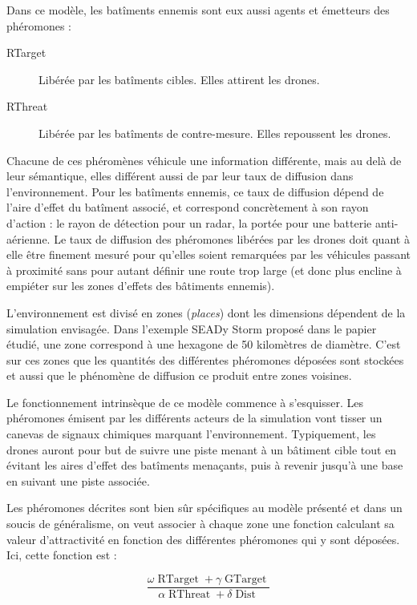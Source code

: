 \documentclass[12pt]{article}
\begin{document}
Dans ce modèle, les batîments ennemis sont eux aussi agents et
émetteurs des phéromones :

\begin{description}
\item[RTarget]{Libérée par les batîments cibles. Elles attirent les
  drones.}
\item[RThreat]{Libérée par les batîments de contre-mesure. Elles
  repoussent les drones.}
\end{description}

Chacune de ces phéromènes véhicule une information différente, mais au
delà de leur sémantique, elles différent aussi de par leur taux de
diffusion dans l'environnement.  Pour les batîments ennemis, ce taux
de diffusion dépend de l'aire d'effet du batîment associé, et
correspond concrètement à son rayon d'action : le rayon de détection
pour un radar, la portée pour une batterie anti-aérienne.  Le taux de
diffusion des phéromones libérées par les drones doit quant à elle
être finement mesuré pour qu'elles soient remarquées par les véhicules
passant à proximité sans pour autant définir une route trop large (et
donc plus encline à empiéter sur les zones d'effets des bâtiments
ennemis).

L'environnement est divisé en zones (\textit{places}) dont les
dimensions dépendent de la simulation envisagée.  Dans l'exemple SEADy
Storm proposé dans le papier étudié, une zone correspond à une
hexagone de 50 kilomètres de diamètre.  C'est sur ces zones que les
quantités des différentes phéromones déposées sont stockées et aussi
que le phénomène de diffusion ce produit entre zones voisines.

Le fonctionnement intrinsèque de ce modèle commence à s'esquisser. Les
phéromones émisent par les différents acteurs de la simulation vont
tisser un canevas de signaux chimiques marquant l'environnement.
Typiquement, les drones auront pour but de suivre une piste menant à
un bâtiment cible tout en évitant les aires d'effet des batîments
menaçants, puis à revenir jusqu'à une base en suivant une piste
associée.

Les phéromones décrites sont bien sûr spécifiques au modèle présenté
et dans un soucis de généralisme, on veut associer à chaque zone une
fonction calculant sa valeur d'attractivité en fonction des
différentes phéromones qui y sont déposées. Ici, cette fonction est :

$$ \frac{\omega \operatorname{RTarget} + \gamma
  \operatorname{GTarget}}{\alpha \operatorname{RThreat} + \delta
  \operatorname{Dist}}
$$
\end{document}
